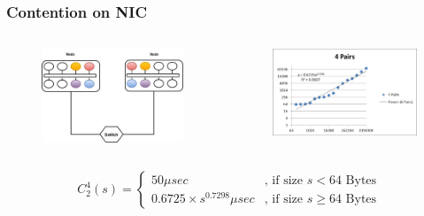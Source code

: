\documentclass{beamer}
\begin{document}

\begin{frame}
\frametitle{Contention on NIC}
\begin{columns}[c]

\begin{figure}
\includegraphics[width=\linewidth,height=\textheight,keepaspectratio]{nodes2p4.jpg}
\end{figure}

\begin{figure}
\includegraphics[width=\linewidth,height=\textheight,keepaspectratio]{picture3.jpg}
\end{figure}

\end{columns}
\begin{block}{}
\begin{equation*}
C_2 ^4 (s)=\begin{cases}
50 \mu sec & \text{, if size }s < 64 \text{ Bytes} \\
0.6725\times s^{0.7298} \mu sec & \text{, if size } s \geq 64\text{ Bytes}
\end{cases}
\end{equation*}
\end{block}

\end{frame}
\end{document}
